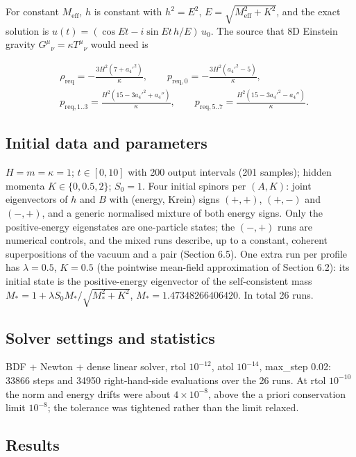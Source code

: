 \documentclass[11pt]{article}
\begin{document}
For constant $M_{\mathrm{eff}}$, $h$ is constant with $h^2=E^2$, $E=\sqrt{M_{\mathrm{eff}}^2+K^2}$, and the exact solution is $u(t)=(\cos Et-i\sin Et\,h/E)\,u_0$. The source that 8D Einstein gravity $G^\mu{}_\nu=\kappa T^\mu{}_\nu$ would need is

\[
\begin{aligned}
&\rho_{\mathrm{req}}=-\frac{3H^2(7+a_4'^2)}{\kappa},\qquad p_{\mathrm{req},0}=-\frac{3H^2(a_4'^2-5)}{\kappa},\\
&p_{\mathrm{req},1..3}=\frac{H^2(15-3a_4'^2+a_4'')}{\kappa},\qquad p_{\mathrm{req},5..7}=\frac{H^2(15-3a_4'^2-a_4'')}{\kappa}.
\end{aligned}
\]

\subsection{Initial data and parameters}

$H=m=\kappa=1$; $t\in[0,10]$ with 200 output intervals (201 samples); hidden momenta $K\in\{0,0.5,2\}$; $S_0=1$. Four initial spinors per $(A,K)$: joint eigenvectors of $h$ and $B$ with (energy, Krein) signs $(+,+)$, $(+,-)$ and $(-,+)$, and a generic normalised mixture of both energy signs. Only the positive-energy eigenstates are one-particle states; the $(-,+)$ runs are numerical controls, and the mixed runs describe, up to a constant, coherent superpositions of the vacuum and a pair (Section 6.5). One extra run per profile has $\lambda=0.5$, $K=0.5$ (the pointwise mean-field approximation of Section 6.2): its initial state is the positive-energy eigenvector of the self-consistent mass $M_\ast=1+\lambda S_0M_\ast/\sqrt{M_\ast^2+K^2}$, $M_\ast=1.47348266406420$. In total 26 runs.

\subsection{Solver settings and statistics}

BDF + Newton + dense linear solver, rtol $10^{-12}$, atol $10^{-14}$, max\_step 0.02: 33866 steps and 34950 right-hand-side evaluations over the 26 runs. At rtol $10^{-10}$ the norm and energy drifts were about $4\times10^{-8}$, above the a priori conservation limit $10^{-8}$; the tolerance was tightened rather than the limit relaxed.

\subsection{Results}
\end{document}
